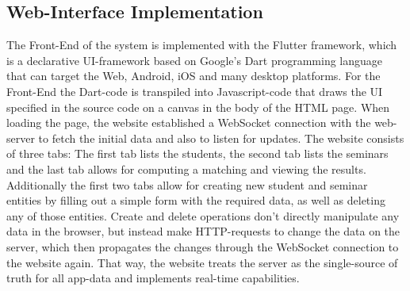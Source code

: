 \subsection{Web-Interface Implementation}
The Front-End of the system is implemented with the Flutter framework, which is a declarative UI-framework based on Google's Dart programming language that can target the Web, Android, iOS and many desktop platforms. For the Front-End the Dart-code is transpiled into Javascript-code that draws the UI specified in the source code on a canvas in the body of the HTML page. When loading the page, the website established a WebSocket connection with the web-server to fetch the initial data and also to listen for updates. 
The website consists of three tabs: The first tab lists the students, the second tab lists the seminars and the last tab allows for computing a matching and viewing the results. Additionally the first two tabs allow for creating new student and seminar entities by filling out a simple form with the required data, as well as deleting any of those entities. Create and delete operations don't directly manipulate any data in the browser, but instead make HTTP-requests to change the data on the server, which then propagates the changes through the WebSocket connection to the website again. That way, the website treats the server as the single-source of truth for all app-data and implements real-time capabilities.
